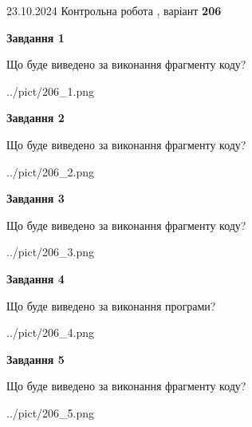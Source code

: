 \documentclass[12pt, ukrainian]{article}
\begin{document}
{\Large{23.10.2024 Контрольна робота , варіант  \No \textbf { 206 }\par}}
{
\begin {large}
{\begin {center}\textbf{Завдання 1}\end {center}}

Що буде виведено за виконання фрагменту коду?\par
\begin{center}
	{../pict/206_1.png}
\end{center}
\newpage

{\begin {center}\textbf{Завдання 2}\end {center}}

Що буде виведено за виконання фрагменту коду?\par
\begin{center}
	{../pict/206_2.png}
\end{center}
\newpage

{\begin {center}\textbf{Завдання 3}\end {center}}

Що буде виведено за виконання фрагменту коду?\par
\begin{center}
	{../pict/206_3.png}
\end{center}
\newpage

{\begin {center}\textbf{Завдання 4}\end {center}}

Що буде виведено за виконання програми?\par
\begin{center}
	{../pict/206_4.png}
\end{center}
\newpage

{\begin {center}\textbf{Завдання 5}\end {center}}

Що буде виведено за виконання фрагменту коду?\par
\begin{center}
	{../pict/206_5.png}
\end{center}
\newpage


\end{large}}
\end{document}
